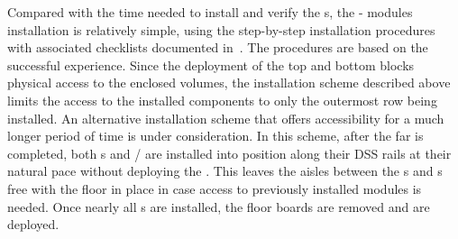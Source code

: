 Compared with the time needed to install and verify the s, the - modules installation is relatively simple, using
the step-by-step installation procedures with associated checklists documented in~\cite{bib:docdb10452}.  The  procedures are based on the successful  experience.  
 Since the deployment of the top and bottom  blocks physical access to the 
 enclosed volumes, the installation scheme described above limits the access to the installed  components to only the outermost row being installed.  An alternative installation scheme that offers accessibility for a much longer period of time is under consideration.  In this scheme, after the far  is completed, both s and / are installed into position along their DSS rails at their natural pace without deploying the . This leaves the aisles between the s and s free with the floor in place in case access to previously installed  modules is needed.  Once nearly all s are installed, the floor boards are removed and  are deployed.   

